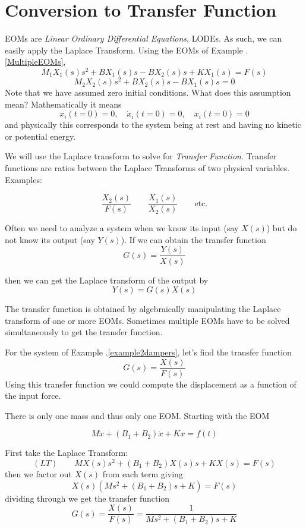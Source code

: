 \section{Conversion to Transfer Function}

EOMs are {\it Linear Ordinary Differential Equations}, LODEs.  As such, we can easily apply the Laplace Transform.
Using the EOMs of Example \thechapter.\ref{MultipleEOMs},
\[
M_1X_1(s)s^2 + BX_1(s)s - BX_2(s)s + KX_1(s) = F(s)
\]
\[
M_2X_2(s)s^2 + BX_2(s)s - BX_1(s)s = 0
\]
Note that we have assumed zero initial conditions.   What does this assumption mean?  Mathematically it means
\[
x_i(t=0) = 0, \quad \dot{x}_i(t=0) = 0, \quad \ddot{x}_i(t=0) = 0
\]
and physically this corresponds to the system being at rest and having no kinetic or potential energy.

We will use the Laplace transform to solve for {\it Transfer Function}.   Transfer functions are ratios between the Laplace Transforms of two physical variables.  Examples:

\[
\frac{X_2(s)}{F(s)} \qquad
\frac{X_1(s)}{X_2(s)} \qquad \mathrm{etc.}
\]

Often we need to analyze a system when we know its input (say $X(s)$) but do not know its output (say $Y(s)$).  If we can obtain the transfer function
\[
G(s) = \frac{Y(s)}{X(s)}
\]

then we can get the Laplace transform of the output by
\[
Y(s) = G(s)X(s)
\]

The transfer function is obtained by algebraically manipulating the Laplace transform of one or more EOMs.
Sometimes multiple EOMs have to be solved simultaneously to get the transfer function.

\begin{ExampleSmall}\label{TransferFunctionExample}
For the system of Example \thechapter.\ref{example2dampers}, let's find the transfer function
\[
G(s) = \frac {X(s)}{F(s)}
\]
Using this transfer function we could compute the displacement as a function of the input force.


There is only one mass and thus only one EOM.  Starting with the EOM

\[
M\ddot{x} + (B_1+B_2)\dot{x}+Kx = f(t)
\]

First take the Laplace Transform:
\[
(LT) \qquad   MX(s)s^2 + (B_1+B_2)X(s)s + KX(s) = F(s)
\]
then we factor out $X(s)$ from each term giving
\[
X(s)\left( Ms^2 +(B_1+B_2)s + K \right) = F(s)
\]
dividing through we get the transfer function
\[
G(s) = \frac {X(s)}{F(s)} = \frac {1}{Ms^2 + (B_1+B_2)s + K }
\]

\end{ExampleSmall}


